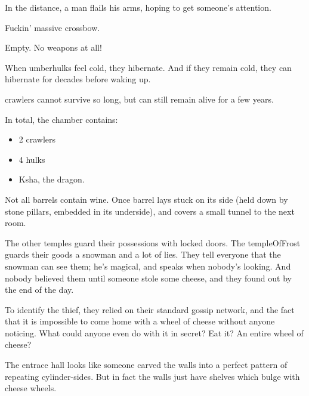\begin{multicols}{2}
In the distance, a man flails his arms, hoping to get someone's attention.


Fuckin' massive crossbow.


Empty.
No weapons at all!


When umberhulks feel cold, they hibernate.
And if they remain cold, they can hibernate for decades before waking up.

\Glspl{crawler} cannot survive so long, but can still remain alive for a few years.

In total, the chamber contains:

\begin{itemize}
  \item
  2 \glspl{crawler}
  \item
  4 \glspl{hulk}
  \item
  Ksha, the dragon.
\end{itemize}



Not all barrels contain wine.
Once barrel lays stuck on its side (held down by stone pillars, embedded in its underside), and covers a small tunnel to the next room.


\begin{exampletext}
  The other \glspl{temple} guard their possessions with locked doors.
  The \gls{templeOfFrost} guards their goods a snowman and a lot of lies.
  They tell everyone that the snowman can see them; he's magical, and speaks when nobody's looking.
  And nobody believed them until someone stole some cheese, and they found out by the end of the day.

  To identify the thief, they relied on their standard gossip network, and the fact that it is impossible to come home with a wheel of cheese without anyone noticing.
  What could anyone even do with it in secret?
  Eat it?
  An entire wheel of cheese?
\end{exampletext}

The entrace hall looks like someone carved the walls into a perfect pattern of repeating cylinder-sides.
But in fact the walls just have shelves which bulge with cheese wheels.


\end{multicols}
